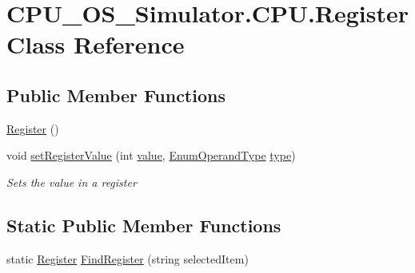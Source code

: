 \hypertarget{class_c_p_u___o_s___simulator_1_1_c_p_u_1_1_register}{}\section{C\+P\+U\+\_\+\+O\+S\+\_\+\+Simulator.\+C\+P\+U.\+Register Class Reference}
\label{class_c_p_u___o_s___simulator_1_1_c_p_u_1_1_register}
\subsection*{Public Member Functions}
\begin{DoxyCompactItemize}
\item 
\hyperlink{class_c_p_u___o_s___simulator_1_1_c_p_u_1_1_register_a1ee1fb682bf9349209b31a50aff2de45}{Register} ()
\item 
void \hyperlink{class_c_p_u___o_s___simulator_1_1_c_p_u_1_1_register_a29b6a87aa7d0bb7fc118b021fc559482}{set\+Register\+Value} (int \hyperlink{class_c_p_u___o_s___simulator_1_1_c_p_u_1_1_register_a2b4f4fe257f216718313f4e1187b72e9}{value}, \hyperlink{namespace_c_p_u___o_s___simulator_1_1_c_p_u_ad49cfe442b74115a326c03b7ae848f76}{Enum\+Operand\+Type} \hyperlink{class_c_p_u___o_s___simulator_1_1_c_p_u_1_1_register_acb2f0f96db7cdee5c175562a5f050d83}{type})
\begin{DoxyCompactList}\small\item\em Sets the value in a register \end{DoxyCompactList}\end{DoxyCompactItemize}
\subsection*{Static Public Member Functions}
\begin{DoxyCompactItemize}
\item 
static \hyperlink{class_c_p_u___o_s___simulator_1_1_c_p_u_1_1_register}{Register} \hyperlink{class_c_p_u___o_s___simulator_1_1_c_p_u_1_1_register_aa1c8b83312ee8b41c4d9cbd328354a6b}{Find\+Register} (string selected\+Item)
\end{DoxyCompactItemize}
